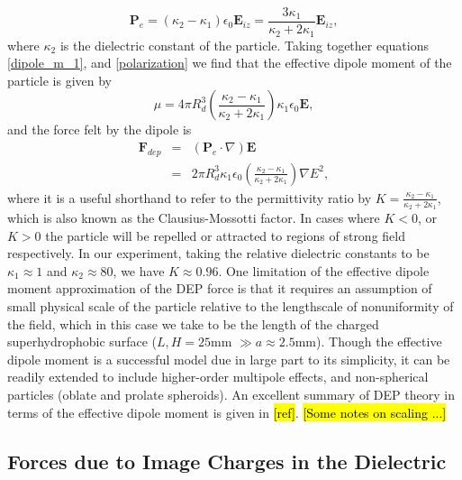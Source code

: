 \documentclass[a4paper, 12pt]{article}
\begin{document}
\begin{equation} \label{polarization}
\mathbf{P}_e = \left( \kappa_2 - \kappa_1 \right) \epsilon_0 \mathbf{E}_{iz} = \frac{3 \kappa_1}{\kappa_2 +2\kappa_1}\mathbf{E}_{iz},
\end{equation}
where $\kappa_2$ is the dielectric constant of the particle. Taking together equations \ref{dipole_m_1}, and \ref{polarization} we find that the effective dipole moment of the particle is given by 
\begin{equation}\label{dipole_m_2}
\mu = 4 \pi R_d^3 \left( \frac{\kappa_2 - \kappa_1}{\kappa_2 + 2 \kappa_1} \right) \kappa_1 \epsilon_0 \mathbf{E},
\end{equation}
and the force felt by the dipole is 
\begin{eqnarray} \label{dep_force}
\mathbf{F}_{dep} &=& \left( \mathbf{P}_e \cdot \nabla \right) \mathbf{E}\\
&=& 2 \pi R_d^3 \kappa_1 \epsilon_0 \left( \frac{\kappa_2 - \kappa_1}{\kappa_2 + 2 \kappa_1} \right) \nabla E^2,
\end{eqnarray}
where it is a useful shorthand to refer to the permittivity ratio by $K = \frac{\kappa_2 - \kappa_1}{\kappa_2 + 2 \kappa_1}$, which is also known as the Clausius-Mossotti factor. In cases where $K < 0$, or $K>0$ the particle will be repelled or attracted to regions of strong field respectively. In our experiment, taking the relative dielectric constants to be $\kappa_1 \approx 1$ and $\kappa_2 \approx 80$, we have $K \approx 0.96$. One limitation of the effective dipole moment approximation of the DEP force is that it requires an assumption of small physical scale of the particle relative to the lengthscale of nonuniformity of the field, which in this case we take to be the length of the charged superhydrophobic surface ($L,H =25$mm $\gg a \approx 2.5$mm). Though the effective dipole moment is a successful model due in large part to its simplicity, it can be readily extended to include higher-order multipole effects, and non-spherical particles (oblate and prolate spheroids). An excellent summary of DEP theory in terms of the effective dipole moment is given in \hl{[ref]}. \hl{[Some notes on scaling ...]}

\subsection{Forces due to Image Charges in the Dielectric}
\end{document}
